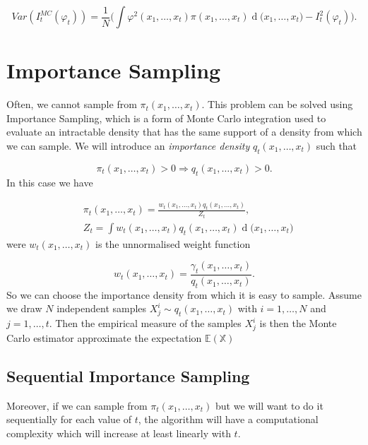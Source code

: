 \documentclass[11pt,a4paper]{article}
\renewcommand{\d}[1]{\ensuremath{\operatorname{d}\!{#1}}}
\begin{document}
\begin{equation*}
    Var(I^{MC}_t(\varphi_t)) = \frac{1}{N} \bigg( \int \varphi^2(x_1, \dots, x_t) \pi(x_1, \dots, x_t) \d (x_1, \dots, x_t) - I^2_t(\varphi_t)\bigg).
\end{equation*}

\section{Importance Sampling}

Often, we cannot sample from $\pi_t (x_1, \dots, x_t)$. This problem can be solved using Importance Sampling, which is a form of Monte Carlo integration used to evaluate an intractable density that has the same support of a density from which we can sample. We will introduce an \textit{importance density} $q_t(x_1, \dots, x_t)$ such that

\begin{equation*}
    \pi_t(x_1, \dots, x_t) > 0 \Rightarrow q_t(x_1, \dots, x_t) > 0.
\end{equation*}
In this case we have

\begin{align*}
    &\pi_t(x_1, \dots, x_t) = \frac{w_t(x_1, \dots, x_t)q_t(x_1, \dots, x_t)}{Z_t}, \\
    &Z_t = \int w_t(x_1, \dots, x_t)q_t(x_1, \dots, x_t) \d (x_1, \dots, x_t)
\end{align*}
were $w_t(x_1, \dots, x_t)$ is the unnormalised weight function

\begin{equation*}
    w_t(x_1, \dots, x_t) = \frac{\gamma_t(x_1, \dots, x_t)}{q_t(x_1, \dots, x_t)}.
\end{equation*}
So we can choose the importance density from which it is easy to sample. Assume we draw $N$ independent samples $X^i_j \sim q_t(x_1, \dots, x_t)$ with $i = 1, \dots, N$ and $j = 1, \dots, t$. Then the empirical measure of the samples $X^i_j$ is  then the Monte Carlo estimator approximate the expectation $\mathbb{E(X)}$



\subsection{Sequential Importance Sampling}

Moreover, if we can sample from $\pi_t (x_1, \dots, x_t)$ but we will want to do it sequentially for each value of $t$, the algorithm will have a computational complexity which will increase at least linearly with $t$. 
\end{document}
